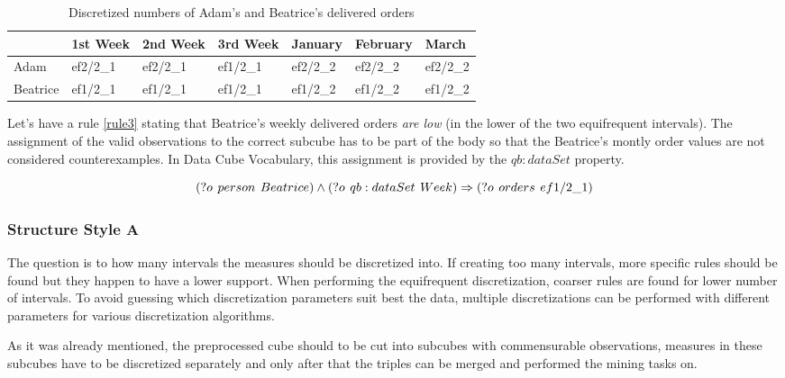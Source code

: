 \begin{table}[h]
\centering
\begin{tabular}{l|llllll}
             & 1st Week & 2nd Week & 3rd Week & January  & February & March     \\ 
\hline
Adam     & ef2/2\_1 & ef2/2\_1 & ef1/2\_1 & ef2/2\_2 & ef2/2\_2 & ef2/2\_2  \\
Beatrice & ef1/2\_1 & ef1/2\_1 & ef1/2\_1 & ef1/2\_2 & ef1/2\_2 & ef1/2\_2 
\end{tabular}
\caption{Discretized numbers of Adam's and Beatrice's delivered orders}\label{table4}
\end{table}

Let's have a rule \ref{rule3} stating that Beatrice's weekly delivered orders \textit{are low} (in the lower of the two equifrequent intervals). The assignment of the valid observations to the correct subcube has to be part of the body so that the Beatrice's montly order values are not considered counterexamples. In Data Cube Vocabulary, this assignment is provided by the $qb:dataSet$ property.

\begin{equation}\label{rule3}
(?o\hspace{0.4em}person\hspace{0.4em}Beatrice) \land (?o\hspace{0.4em}qb:dataSet\hspace{0.4em}Week)  \Rightarrow (?o\hspace{0.4em}orders\hspace{0.4em}ef1/2\_1)
\end{equation}

\subsubsection{Structure Style A}

The question is to how many intervals the measures should be discretized into. If creating too many intervals, more specific rules should be found but they happen to have a lower support. When performing the equifrequent discretization, coarser rules are found for lower number of intervals. To avoid guessing which discretization parameters suit best the data, multiple discretizations can be performed with different parameters for various discretization algorithms.

As it was already mentioned, the preprocessed cube should to be cut into subcubes with commensurable observations, measures in these subcubes have to be discretized separately and only after that the triples can be merged and performed the mining tasks on.

